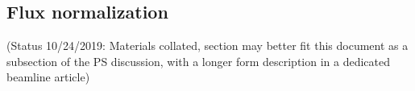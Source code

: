 \subsection{Flux normalization \label{sec:fluxnorm}}

{\color{red}(Status 10/24/2019: Materials collated, section may better fit this document as a subsection of the PS discussion, with a longer form description in a dedicated beamline article)}



